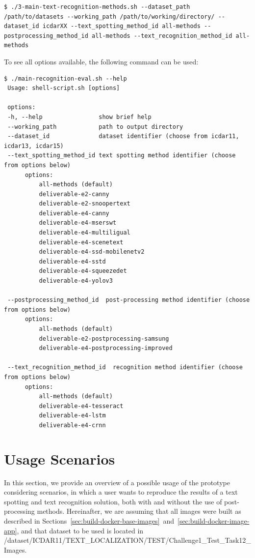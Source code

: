 \begin{lstlisting}[style=fancyterminal]
 $ ./3-main-text-recognition-methods.sh --dataset_path /path/to/datasets --working_path /path/to/working/directory/ --dataset_id icdarXX --text_spotting_method_id all-methods --postprocessing_method_id all-methods --text_recognition_method_id all-methods
\end{lstlisting}

To see all options available, the following command can be used:

\begin{lstlisting}[style=fancyterminal]
 $ ./main-recognition-eval.sh --help
 Usage: shell-script.sh [options]

 options:
 -h, --help                show brief help
 --working_path            path to output directory
 --dataset_id              dataset identifier (choose from icdar11, icdar13, icdar15)
 --text_spotting_method_id text spotting method identifier (choose from options below)
      options:
          all-methods (default)
          deliverable-e2-canny
          deliverable-e2-snoopertext
          deliverable-e4-canny
          deliverable-e4-mserswt
          deliverable-e4-multiligual
          deliverable-e4-scenetext
          deliverable-e4-ssd-mobilenetv2
          deliverable-e4-sstd
          deliverable-e4-squeezedet
          deliverable-e4-yolov3
          
 --postprocessing_method_id  post-processing method identifier (choose from options below)
      options:
          all-methods (default)
          deliverable-e2-postprocessing-samsung
          deliverable-e4-postprocessing-improved

 --text_recognition_method_id  recognition method identifier (choose from options below)
      options:
          all-methods (default)
          deliverable-e4-tesseract
          deliverable-e4-lstm
          deliverable-e4-crnn
\end{lstlisting}




\section{Usage Scenarios}
\label{sec:usage-scenario}

In this section, we provide an overview of a possible usage of the prototype considering scenarios, in which a user wants to reproduce the results of a text spotting and text recognition solution, both with and without the use of post-processing methods. Hereinafter, we are assuming that all images were built as described in Sections~\ref{sec:build-docker-base-images}~and~\ref{sec:build-docker-image-app}, and that dataset to be used is located in {\footnotesize \ttfamily /dataset/ICDAR11/TEXT\_LOCALIZATION/TEST/Challenge1\_Test\_Task12\_Images}.

